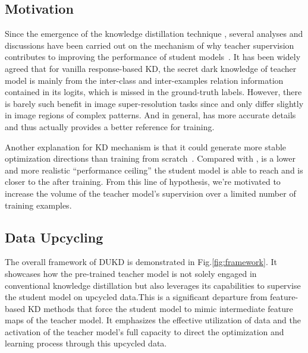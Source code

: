 \documentclass[10pt,twocolumn,letterpaper]{article}
\newcommand{\red}[1]{{\color{black}#1}}
\begin{document}
\red{
\subsection{Motivation} \label{sec: motivation}
Since the emergence of the knowledge distillation technique \cite{hinton2015distilling}, several analyses and discussions have been carried out on the mechanism of why teacher supervision contributes to improving the performance of student models~\cite{tang2020understanding,stanton2021does,wang2021revisiting,zhang2022quantifying,harutyunyan2023supervision}. It has been widely agreed that for vanilla response-based KD, the secret dark knowledge of teacher model is mainly from the inter-class and inter-examples relation information contained in its logits, which is missed in the ground-truth labels. However, there is barely such benefit in image super-resolution tasks since  and  only differ slightly in image regions of complex patterns. And in general,  has more accurate details and thus actually provides a better reference for training.

Another explanation for KD mechanism is that it could generate more stable optimization directions than training from scratch~\cite{tang2020understanding,zhang2022quantifying}. Compared with ,  is a  lower and more realistic ``performance ceiling'' the student model is able to reach and is closer to the  after training. From this line of hypothesis, we're motivated to increase the volume of the teacher model's supervision over a limited number of training examples.
}

\subsection{Data Upcycling} \label{sec: unlabeled-data}

The overall framework of DUKD is demonstrated in Fig.\ref{fig:framework}. It showcases how the pre-trained teacher model is not solely engaged in conventional knowledge distillation but also leverages its capabilities to supervise the student model on upcycled data.This is a significant departure from feature-based KD methods that force the student model to mimic intermediate feature maps of the teacher model. It emphasizes the effective utilization of data and the activation of the teacher model's full capacity to direct the optimization and learning process through this upcycled data.
\end{document}
